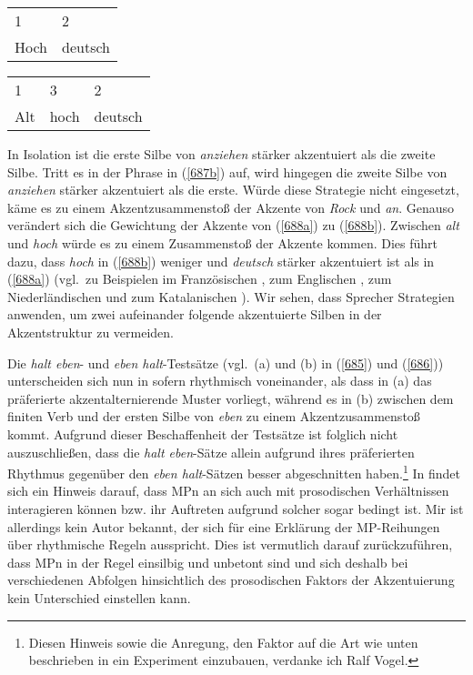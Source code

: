 \begin{exe}
	\ex\label{688} 
	\begin{xlist} 
	\ex\label{688a}
	\begin{tabular}[t]{ll}
	1 & 2 \\
	Hoch & deutsch
    \end{tabular}
    \ex\label{688b}
	\begin{tabular}[t]{lll}
	1 & 3 & 2 \\
	Alt & hoch & deutsch
    \end{tabular}
    \hfill\hbox{\citet[1]{Wagner2002}}
\end{xlist}    
\end{exe}
In Isolation ist die erste Silbe von \textit{anziehen} stärker akzentuiert als die zweite Silbe. Tritt es in der Phrase in (\ref{687b}) auf, wird hingegen die zweite Silbe von \textit{anziehen} stärker akzentuiert als die erste. Würde diese Strategie nicht eingesetzt, käme es zu einem Akzentzusammenstoß der Akzente von \textit{Rock} und \textit{an}. Genauso verändert sich die Gewichtung der Akzente von (\ref{688a}) zu (\ref{688b}). Zwischen \textit{alt} und \textit{hoch} würde es zu einem Zusammenstoß der Akzente kommen. Dies führt dazu, dass \textit{hoch} in (\ref{688b}) weniger und \textit{deutsch} stärker akzentuiert ist als in (\ref{688a}) (vgl.\  zu Beispielen im Französischen \citealt{Mazzola1992}, zum Englischen \citealt{Vogel1995}, zum Niederländischen \citealt[141]{Gussenhoven2004} und zum Katalanischen \citealt{Prieto2010}). Wir sehen, dass Sprecher Strategien anwenden, um zwei aufeinander folgende akzentuierte Silben in der Akzentstruktur zu vermeiden.

Die \textit{halt eben}- und \textit{eben halt}-Testsätze (vgl.\ (a) und (b) in (\ref{685}) und (\ref{686})) unterscheiden sich nun in sofern rhythmisch voneinander, als dass in (a) das präferierte akzentalternierende Muster vorliegt, während es in (b) zwischen dem finiten Verb und der ersten Silbe von \textit{eben} zu einem Akzentzusammenstoß kommt. Aufgrund dieser Beschaffenheit der Testsätze ist folglich nicht auszu\-schließen, dass die \textit{halt eben}-Sätze allein aufgrund ihres präferierten Rhythmus gegenüber den \textit{eben halt}-Sätzen besser abgeschnitten haben.\footnote{Diesen Hinweis sowie die Anregung, den Faktor auf die Art wie unten beschrieben in ein Experiment einzubauen, verdanke ich Ralf Vogel.} In \citet[32--33]{Franck1980} findet sich ein Hinweis darauf, dass MPn an sich auch mit prosodischen Verhältnissen interagieren können bzw. ihr Auftreten aufgrund solcher sogar bedingt ist. Mir ist allerdings kein Autor bekannt, der sich für eine Erklärung der MP-Reihungen über rhythmische Regeln ausspricht. Dies ist vermutlich darauf zurückzuführen, dass MPn in der Regel einsilbig und unbetont sind und sich deshalb bei verschiedenen Abfolgen hinsichtlich des prosodischen Faktors der Akzentuierung kein Unterschied einstellen kann. 

